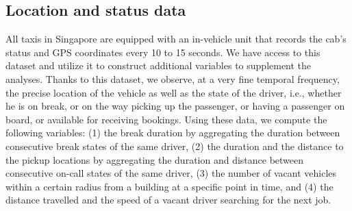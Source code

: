 \documentclass[reviewmode,AEJ]{AEA}
\begin{document}



\subsection{Location and status data}
All taxis in Singapore are equipped with an in-vehicle unit that records the cab's status and GPS 
coordinates every 10 to 15 seconds. We have access to this dataset and utilize it to construct additional variables to supplement the analyses. Thanks to this dataset, we observe, at a very fine temporal frequency, the precise location of the vehicle as well as the state of the driver, i.e., whether he is on break, or on the way picking up the passenger, or having a passenger on board, or available for receiving bookings. Using these data, we compute the following variables: (1) the break duration by aggregating the duration between consecutive break states of the same driver, (2) the duration and  the distance to the pickup locations by aggregating the duration and distance between consecutive on-call states of the same driver, (3) the number of vacant vehicles within a certain radius from a building at a specific point in time, and (4) the distance travelled and the speed of a vacant driver searching for the next job. 
\end{document}
